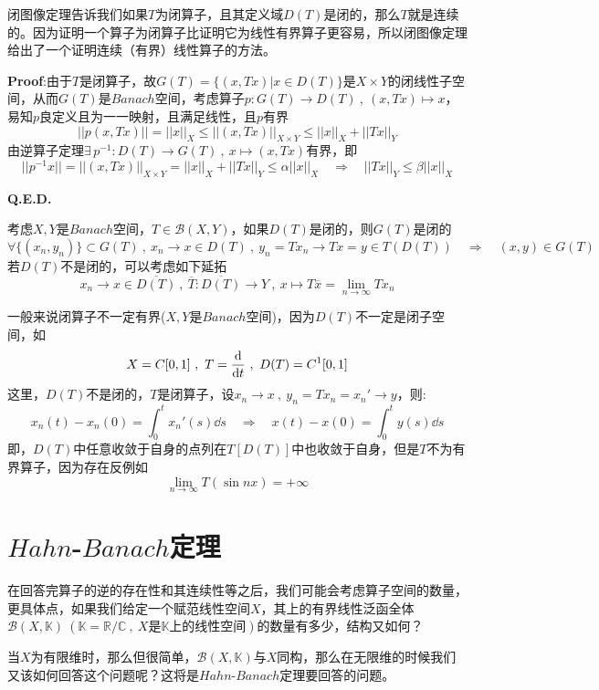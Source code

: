 闭图像定理告诉我们如果$T$为闭算子，且其定义域$D(T)$是闭的，那么$T$就是连续的。因为证明一个算子为闭算子比证明它为线性有界算子更容易，所以闭图像定理给出了一个证明连续（有界）线性算子的方法。

\textbf{Proof}:由于$T$是闭算子，故$G(T)=\{(x,Tx)|x \in D(T)\}$是$X \times Y$的闭线性子空间，从而$G(T)$是$Banach$空间，考虑算子$p:G(T) \to D(T) \ , \ (x,Tx) \mapsto x$，易知$p$良定义且为一一映射，且满足线性，且$p$有界
\[||p(x,Tx)||=||x||_X \leq ||(x,Tx)||_{X \times Y} \leq ||x||_X + ||Tx||_Y\]
由逆算子定理$\exists \, p^{-1}:D(T) \to G(T) \ , \ x \mapsto (x,Tx)$有界，即
\[||p^{-1}x||=||(x,Tx)||_{X \times Y}=||x||_X + ||Tx||_Y \leq \alpha ||x||_X \quad \Rightarrow \quad ||Tx||_Y \leq \beta ||x||_X\]

\textbf{Q.E.D.}

考虑$X,Y$是$Banach$空间，$T \in \mathscr{B}(X,Y)$，如果$D(T)$是闭的，则$G(T)$是闭的
\[\forall\{(x_n,y_n)\} \subset G(T) \ , \ x_n \to x \in D(T) \ , \ y_n=Tx_n \to Tx=y \in T(D(T)) \quad \Rightarrow \quad (x,y) \in G(T)\]
若$D(T)$不是闭的，可以考虑如下延拓
\[x_n \to x \in \overline{D(T)} \ , \ \overline{T}:\overline{D(T)} \to Y \ , \ x \mapsto T\overline{x}=\lim_{n \to \infty}Tx_n\]

一般来说闭算子不一定有界($X,Y$是$Banach$空间)，因为$D(T)$不一定是闭子空间，如
\[X=C[0,1] \ , \ T=\dv{t} \ , \ D(T)=C^1[0,1]\]
这里，$D(T)$不是闭的，$T$是闭算子，设$x_n \to x \ , \ y_n=Tx_n=x_n' \to y$，则:
\[x_n(t)-x_n(0)=\int_0^tx_n'(s) \dd s \quad \Rightarrow \quad x(t)-x(0)=\int_0^ty(s) \dd s\]
即，$D(T)$中任意收敛于自身的点列在$T[D(T)]$中也收敛于自身，但是$T$不为有界算子，因为存在反例如
\[\lim_{n \to \infty}T(\sin nx)=+\infty\]

\section{$Hahn$-$Banach$定理}
在回答完算子的逆的存在性和其连续性等之后，我们可能会考虑算子空间的数量，更具体点，如果我们给定一个赋范线性空间$X$，其上的有界线性泛函全体$\mathscr{B}(X,\mathbb{K}) \ (\mathbb{K}=\mathbb{R}/\mathbb{C} \ , \ X\text{是}\mathbb{K}\text{上的线性空间})$的数量有多少，结构又如何？

当$X$为有限维时，那么但很简单，$\mathscr{B}(X,\mathbb{K})$与$X$同构，那么在无限维的时候我们又该如何回答这个问题呢？这将是$Hahn$-$Banach$定理要回答的问题。

